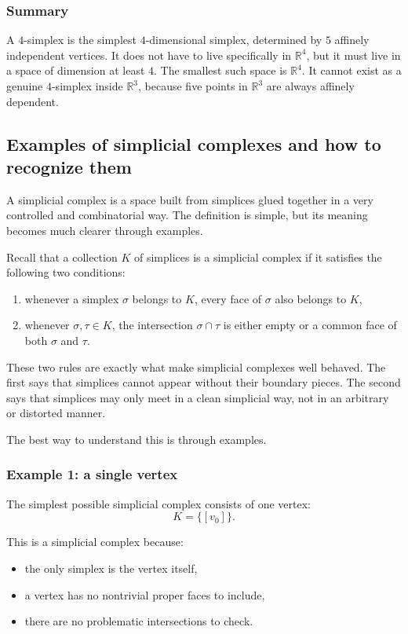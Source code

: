 \documentclass[12pt,a4paper]{article}
\theoremstyle{notespace}
\begin{document}
\subsubsection{Summary}

A \(4\)-simplex is the simplest \(4\)-dimensional simplex, determined by \(5\) affinely independent vertices. It does not have to live specifically in \(\mathbb{R}^4\), but it must live in a space of dimension at least \(4\). The smallest such space is \(\mathbb{R}^4\). It cannot exist as a genuine \(4\)-simplex inside \(\mathbb{R}^3\), because five points in \(\mathbb{R}^3\) are always affinely dependent.


\subsection{Examples of simplicial complexes and how to recognize them}

A simplicial complex is a space built from simplices glued together in a very controlled and combinatorial way. The definition is simple, but its meaning becomes much clearer through examples.

Recall that a collection \(K\) of simplices is a simplicial complex if it satisfies the following two conditions:
\begin{enumerate}
	\item whenever a simplex \(\sigma\) belongs to \(K\), every face of \(\sigma\) also belongs to \(K\),
	\item whenever \(\sigma,\tau\in K\), the intersection \(\sigma\cap\tau\) is either empty or a common face of both \(\sigma\) and \(\tau\).
\end{enumerate}

These two rules are exactly what make simplicial complexes well behaved. The first says that simplices cannot appear without their boundary pieces. The second says that simplices may only meet in a clean simplicial way, not in an arbitrary or distorted manner.

The best way to understand this is through examples.

\subsubsection{Example 1: a single vertex}

The simplest possible simplicial complex consists of one vertex:
\[
K=\{[v_0]\}.
\]

This is a simplicial complex because:
\begin{itemize}
	\item the only simplex is the vertex itself,
	\item a vertex has no nontrivial proper faces to include,
	\item there are no problematic intersections to check.
\end{itemize}
\end{document}

